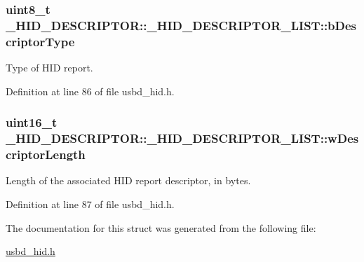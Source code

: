 \subsubsection[{\texorpdfstring{b\+Descriptor\+Type}{bDescriptorType}}]{\setlength{\rightskip}{0pt plus 5cm}uint8\+\_\+t \+\_\+\+H\+I\+D\+\_\+\+D\+E\+S\+C\+R\+I\+P\+T\+O\+R\+::\+\_\+\+H\+I\+D\+\_\+\+D\+E\+S\+C\+R\+I\+P\+T\+O\+R\+\_\+\+L\+I\+S\+T\+::b\+Descriptor\+Type}\hypertarget{struct__HID__DESCRIPTOR_1_1__HID__DESCRIPTOR__LIST_af5a02f1ba9ad4951dc9d5548f5f3eeef}{}\label{struct__HID__DESCRIPTOR_1_1__HID__DESCRIPTOR__LIST_af5a02f1ba9ad4951dc9d5548f5f3eeef}
Type of H\+ID report. 

Definition at line 86 of file usbd\+\_\+hid.\+h.

\subsubsection[{\texorpdfstring{w\+Descriptor\+Length}{wDescriptorLength}}]{\setlength{\rightskip}{0pt plus 5cm}uint16\+\_\+t \+\_\+\+H\+I\+D\+\_\+\+D\+E\+S\+C\+R\+I\+P\+T\+O\+R\+::\+\_\+\+H\+I\+D\+\_\+\+D\+E\+S\+C\+R\+I\+P\+T\+O\+R\+\_\+\+L\+I\+S\+T\+::w\+Descriptor\+Length}\hypertarget{struct__HID__DESCRIPTOR_1_1__HID__DESCRIPTOR__LIST_ad367e538b51883805ae462a047546ee7}{}\label{struct__HID__DESCRIPTOR_1_1__HID__DESCRIPTOR__LIST_ad367e538b51883805ae462a047546ee7}
Length of the associated H\+ID report descriptor, in bytes. 

Definition at line 87 of file usbd\+\_\+hid.\+h.



The documentation for this struct was generated from the following file\+:\begin{DoxyCompactItemize}
\item 
\hyperlink{usbd__hid_8h}{usbd\+\_\+hid.\+h}\end{DoxyCompactItemize}
